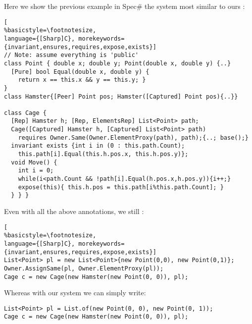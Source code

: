  Here we show the previous example in Spec\# the system most similar to ours :
\begin{lstlisting}[
%basicstyle=\footnotesize,
language={[Sharp]C}, morekeywords={invariant,ensures,requires,expose,exists}]
// Note: assume everything is 'public'
class Point { double x; double y; Point(double x, double y) {..}
  [Pure] bool Equal(double x, double y) {
    return x == this.x && y == this.y; }
}
class Hamster{[Peer] Point pos; Hamster([Captured] Point pos){..}}

class Cage {
  [Rep] Hamster h; [Rep, ElementsRep] List<Point> path;
  Cage([Captured] Hamster h, [Captured] List<Point> path)
    requires Owner.Same(Owner.ElementProxy(path), path);{..; base();}
  invariant exists {int i in (0 : this.path.Count);
    this.path[i].Equal(this.h.pos.x, this.h.pos.y)};
  void Move() {
    int i = 0;
    while(i<path.Count && !path[i].Equal(h.pos.x,h.pos.y)){i++;}
    expose(this){ this.h.pos = this.path[i%this.path.Count]; }
  } } }
\end{lstlisting}
 
\noindent Even with all the above annotations, we still :
\begin{lstlisting}[
%basicstyle=\footnotesize,
language={[Sharp]C}, morekeywords={invariant,ensures,requires,expose,exists}]
List<Point> pl = new List<Point>{new Point(0,0), new Point(0,1)};
Owner.AssignSame(pl, Owner.ElementProxy(pl));
Cage c = new Cage(new Hamster(new Point(0, 0)), pl);
\end{lstlisting}
Whereas with our system we can simply write:
\begin{lstlisting}
List<Point> pl = List.of(new Point(0, 0), new Point(0, 1));
Cage c = new Cage(new Hamster(new Point(0, 0)), pl);
\end{lstlisting}

